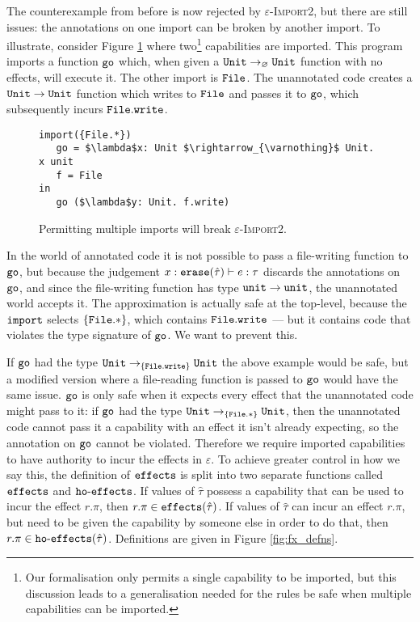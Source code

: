 The counterexample from before is now rejected by \textsc{$\varepsilon$-Import2}, but there are still issues: the annotations on one import can be broken by another import. To illustrate, consider Figure \ref{fig:rule_import2_counterexample} where two\footnote{Our formalisation only permits a single capability to be imported, but this discussion leads to a generalisation needed for the rules be safe when multiple capabilities can be imported.} capabilities are imported. This program imports a function $\mathtt{go}$ which, when given a $\mathtt{Unit} \rightarrow_{\varnothing} \mathtt{Unit}$ function with no effects, will execute it. The other import is $\mathtt{File}$. The unannotated code creates a $\mathtt{Unit} \rightarrow \mathtt{Unit}$ function which writes to $\mathtt{File}$ and passes it to $\mathtt{go}$, which subsequently incurs $\mathtt{File.write}$.

\begin{figure}[h]

\begin{lstlisting}
import({File.*})
   go = $\lambda$x: Unit $\rightarrow_{\varnothing}$ Unit. x unit
   f = File
in
   go ($\lambda$y: Unit. f.write)

\end{lstlisting}

\vspace{-7pt}
\caption{Permitting multiple imports will break \textsc{$\varepsilon$-Import2}.}
\label{fig:rule_import2_counterexample}
\end{figure}

In the world of annotated code it is not possible to pass a file-writing function to $\mathtt{go}$, but because the judgement $x: \mathtt{erase}(\hat \tau) \vdash e: \tau$ discards the annotations on $\mathtt{go}$, and since the file-writing function has type $\mathtt{unit} \rightarrow \mathtt{unit}$, the unannotated world accepts it. The approximation is actually safe at the top-level, because the $\mathtt{import}$ selects $\{ \mathtt{File.*} \}$, which contains $\mathtt{File.write}$ --- but it contains code that violates the type signature of $\mathtt{go}$. We want to prevent this.

If $\mathtt{go}$ had the type $\mathtt{Unit} \rightarrow_{\{ \mathtt{File.write} \}} \mathtt{Unit}$ the above example would be safe, but a modified version where a file-reading function is passed to $\mathtt{go}$ would have the same issue. $\mathtt{go}$ is only safe when it expects every effect that the unannotated code might pass to it: if $\mathtt{go}$ had the type $\mathtt{Unit} \rightarrow_{\{ \mathtt{File.*} \}} \mathtt{Unit}$, then the unannotated code cannot pass it a capability with an effect it isn't already expecting, so the annotation on $\mathtt{go}$ cannot be violated. Therefore we require imported capabilities to have authority to incur the effects in $\varepsilon$. To achieve greater control in how we say this, the definition of $\mathtt{effects}$ is split into two separate functions called $\mathtt{effects}$ and $\mathtt{ho \hbox{-} effects}$. If values of $\hat \tau$ possess a capability that can be used to incur the effect $r.\pi$, then $r.\pi \in \mathtt{effects}(\hat \tau)$. If values of $\hat \tau$ can incur an effect $r.\pi$, but need to be given the capability by someone else in order to do that, then $r.\pi \in \mathtt{ho \hbox{-} effects}(\hat \tau)$. Definitions are given in Figure \ref{fig:fx_defns}.


